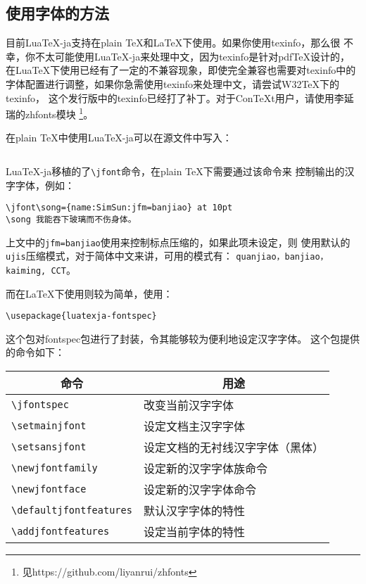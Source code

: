 \documentclass[DIV=13]{article}
\def\LuaTeX{Lua\TeX}
\def\ConTeXt{Con\TeX t}
\begin{document}
\subsection{使用字体的方法}

目前\LuaTeX-ja支持在plain \TeX 和\LaTeX 下使用。如果你使用texinfo，那么很
不幸，你不太可能使用\LuaTeX-ja来处理中文，因为texinfo是针对pdf\TeX 设计的，
在\LuaTeX 下使用已经有了一定的不兼容现象，即使完全兼容也需要对texinfo中的
字体配置进行调整，如果你急需使用texinfo来处理中文，请尝试W32\TeX 下的texinfo，
这个发行版中的texinfo已经打了补丁。对于\ConTeXt 用户，请使用李延瑞的zhfonts模块
\footnote{见https://github.com/liyanrui/zhfonts}。

在plain \TeX 中使用Lua\TeX-ja可以在源文件中写入：
\begin{verbatim}

\end{verbatim}

Lua\TeX-ja移植的了\verb!\jfont!命令，在plain \TeX 下需要通过该命令来
控制输出的汉字字体，例如：
\begin{verbatim}
\jfont\song={name:SimSun:jfm=banjiao} at 10pt
\song 我能吞下玻璃而不伤身体。
\end{verbatim}

上文中的\verb!jfm=banjiao!使用来控制标点压缩的，如果此项未设定，则
使用默认的\verb!ujis!压缩模式，对于简体中文来讲，可用的模式有：
\texttt{quanjiao，banjiao，kaiming, CCT}。

而在\LaTeX 下使用则较为简单，使用：
\begin{verbatim}
\usepackage{luatexja-fontspec}
\end{verbatim}
这个包对fontspec包进行了封装，令其能够较为便利地设定汉字字体。
这个包提供的命令如下：
\begin{table}[htbp]
  \centering
    \begin{tabular}{ll}
    \toprule
    \multicolumn{1}{c}{\textbf{命令}} & \multicolumn{1}{c}{\textbf{用途}} \\
    \midrule
    \verb!\jfontspec! & 改变当前汉字字体 \\
    \verb!\setmainjfont! & 设定文档主汉字字体 \\
    \verb!\setsansjfont! & 设定文档的无衬线汉字字体（黑体） \\
    \verb!\newjfontfamily! & 设定新的汉字字体族命令 \\
    \verb!\newjfontface! & 设定新的汉字字体命令 \\
    \verb!\defaultjfontfeatures! & 默认汉字字体的特性 \\
    \verb!\addjfontfeatures! & 设定当前字体的特性 \\
    \bottomrule
    \end{tabular}%
\end{table}%
\end{document}
